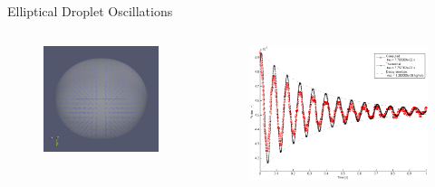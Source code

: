 \begin{frame}{\thesec}{Elliptical Droplet Oscillations}
  \vspace*{-2.1\baselineskip}
  \begin{columns}
    \begin{column}{0.5\textwidth}
      \begin{figure}
        \centering
        \includegraphics[width=\textwidth]{img/oscdrop0.png}
      \end{figure}
    \end{column}
    \begin{column}{0.5\textwidth}
      \begin{figure}
        \centering
        \includegraphics[width=\textwidth]{img/oscdrop_rad.png}
      \end{figure}
    \end{column}
  \end{columns}
\end{frame}

